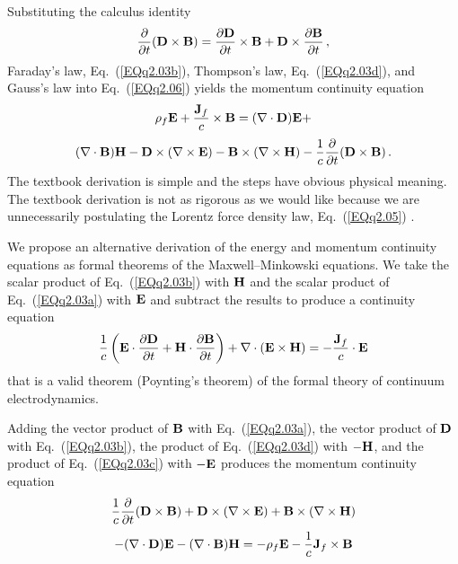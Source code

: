 \documentclass[twocolumn,amssymb,eqsecnum,aps,pra]{revtex4-2}
\begin{document}
Substituting the calculus identity
\begin{equation}
\frac{\partial}{\partial t}({\bf D}\times{\bf B}) =
\frac{\partial{\bf D}}{\partial t}\times{\bf B} +
{\bf D}\times \frac{\partial{\bf B}}{\partial t} \, ,
\label{EQq2.07}
\end{equation}
Faraday's law, Eq.~(\ref{EQq2.03b}), Thompson's law,
Eq.~(\ref{EQq2.03d}), and Gauss's law into Eq.~(\ref{EQq2.06})
yields the momentum continuity
equation \cite{BIJackson,BIGriff,BIZangwill}
$$
\rho_f{\bf E}+\frac{{\bf J}_f}{c}\times{\bf B} =
(\nabla\cdot{\bf D}){\bf E} +
$$
\begin{equation}
(\nabla\cdot{\bf B}){\bf H} 
-{\bf D}\times(\nabla\times {\bf E})
-{\bf B}\times(\nabla\times{\bf H})
-\frac{1}{c}\frac{\partial}{\partial t}({\bf D}\times{\bf B}) \, .
\label{EQq2.08}
\end{equation}
The textbook derivation is simple and the steps have obvious physical
meaning.
The textbook derivation is not as rigorous as we would like because
we are unnecessarily postulating the Lorentz force density law,
Eq.~(\ref{EQq2.05}) 
\cite{BIBoydMil,BIJackson,BIGriff,BIZangwill,BIManx,BIMansurx}.
\par
We propose an alternative derivation of the energy and momentum
continuity equations as formal theorems of the Maxwell--Minkowski
equations.
We take the scalar product of Eq.~(\ref{EQq2.03b}) with ${\bf H}$ and
the scalar product of Eq.~(\ref{EQq2.03a}) with ${\bf E}$ and subtract
the results to produce a continuity equation \cite{BIMar,BIOptCommun}
\begin{equation}
\frac{1}{c}\left (
{\bf E}\cdot\frac{\partial{\bf D}}{\partial t}
+{\bf H}\cdot \frac{\partial{\bf B}}{\partial t}
\right )
+\nabla\cdot ({\bf E}\times{\bf H})=-\frac{{\bf J}_f}{c}\cdot{\bf E} 
\label{EQq2.09}
\end{equation}
that is a valid theorem (Poynting's theorem) of the formal theory of
continuum electrodynamics.
\par
Adding
the vector product of ${\bf B}$ with Eq.~(\ref{EQq2.03a}),
the vector product of ${\bf D}$ with Eq.~(\ref{EQq2.03b}),
the product of Eq.~(\ref{EQq2.03d}) with $-{\bf H}$, and
the product of Eq.~(\ref{EQq2.03c}) with $-{\bf E}$
produces the momentum continuity equation
$$
\frac{1}{c}\frac{\partial}{\partial t}({\bf D}\times{\bf B})
+{\bf D}\times(\nabla\times {\bf E})
+{\bf B}\times(\nabla\times{\bf H})
$$
\begin{equation}
-(\nabla\cdot{\bf D}){\bf E} - (\nabla\cdot{\bf B}){\bf H} =
-\rho_f{\bf E} -\frac{1}{c}{\bf J}_f\times{\bf B}
\label{EQq2.10}
\end{equation}
\end{document}

